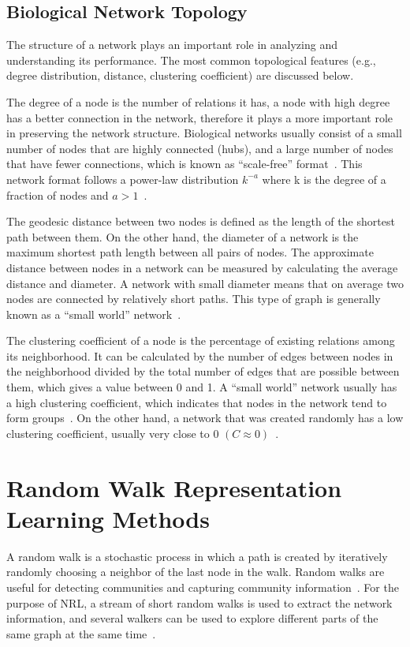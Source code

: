 \subsection{Biological Network Topology}

The structure of a network plays an important role in analyzing and understanding its performance.
The most common topological features (e.g., degree distribution, distance, clustering coefficient) are discussed below.

The degree of a node is the number of relations it has, a node with high degree has a better connection in the network, therefore it plays a more important role in preserving the network structure.
Biological networks usually consist of a small number of nodes that are highly connected (hubs), and a large number of nodes that have fewer connections, which is known as “scale-free” format~\cite{zhu_getting_2007}.
This network format follows a power-law distribution $k^{-a}$ where k is the degree of a fraction of nodes and $a>1$~\cite{broido_scale-free_2019}.

The geodesic distance between two nodes is defined as the length of the shortest path between them.
On the other hand, the diameter of a network is the maximum shortest path length between all pairs of nodes.
The approximate distance between nodes in a network can be measured by calculating the average distance and diameter.
A network with small diameter means that on average two nodes are connected by relatively short paths.
This type of graph is generally known as a “small world” network~\cite{zhu_getting_2007}.

The clustering coefficient of a node is the percentage of existing relations among its neighborhood.
It can be calculated by the number of edges between nodes in the neighborhood divided by the total number of edges that are possible between them, which gives a value between 0 and 1.
A “small world” network usually has a high clustering coefficient, which indicates that nodes in the network tend to form groups~\cite{zhu_getting_2007}.
On the other hand, a network that was created randomly has a low clustering coefficient, usually very close to 0 $(C \approx 0)$~\cite{newman_random_2002}.

\section{Random Walk Representation Learning Methods}

A random walk is a stochastic process in which a path is created by iteratively randomly choosing a neighbor of the last node in the walk.
Random walks are useful for detecting communities and capturing community information~\cite{perozzi_deepwalk:_2014}.
For the purpose of \ac{NRL}, a stream of short random walks is used to extract the network information, and several walkers can be used to explore different parts of the same graph at the same time~\cite{perozzi_deepwalk:_2014}.

